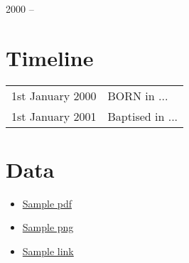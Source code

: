 \begin{center}
\huge{2000 --}
\end{center}

\vspace{1in}

\begin{center}
\end{center}

\newpage
\section{Timeline}
\begin{table}[h]
\renewcommand\arraystretch{1.4}
\begin{tabular}{@{\,}r <{\hskip 2pt} !{\foo} >{\raggedright\arraybackslash}p{20cm}}
\addlinespace[1.5ex]
1st January 2000 & BORN in ...\\
1st January 2001 & Baptised in ... \\
\end{tabular}
\end{table}

\section{Data}
\begin{itemize}
\item \href{run:people/Child1/sample.pdf}{Sample pdf}
\item \href{run:people/Child1/sample.png}{Sample png}
\item \href{https://github.com/StevenElsworth?tab=repositories}{Sample link} 
\end{itemize}
